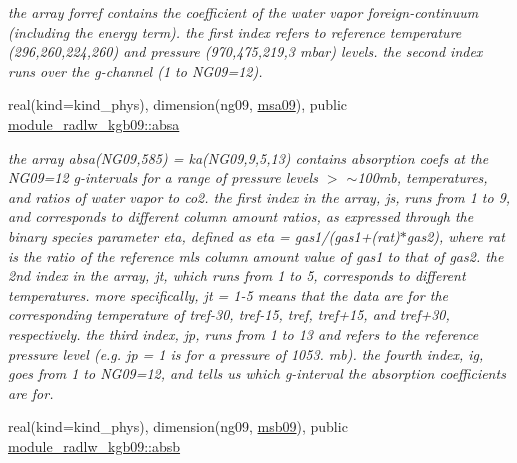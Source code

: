\begin{DoxyCompactItemize}
\begin{DoxyCompactList}\small\item\em the array forref contains the coefficient of the water vapor foreign-\/continuum (including the energy term). the first index refers to reference temperature (296,260,224,260) and pressure (970,475,219,3 mbar) levels. the second index runs over the g-\/channel (1 to N\+G09=12). \end{DoxyCompactList}\item 
\mbox{\label{group__module__radlw__kgbnn_ga7a8726efe46fac4d6cce55ca357199ab}} 
real(kind=kind\+\_\+phys), dimension(ng09, \hyperlink{namespacemodule__radlw__kgb09_ab739f0acab23f3140067506b396b3717}{msa09}), public \hyperlink{group__module__radlw__kgbnn_ga7a8726efe46fac4d6cce55ca357199ab}{module\+\_\+radlw\+\_\+kgb09\+::absa}
\begin{DoxyCompactList}\small\item\em the array absa(\+N\+G09,585) = ka(\+N\+G09,9,5,13) contains absorption coefs at the N\+G09=12 g-\/intervals for a range of pressure levels $>$ $\sim$100mb, temperatures, and ratios of water vapor to co2. the first index in the array, js, runs from 1 to 9, and corresponds to different column amount ratios, as expressed through the binary species parameter eta, defined as eta = gas1/(gas1+(rat)$\ast$gas2), where rat is the ratio of the reference mls column amount value of gas1 to that of gas2. the 2nd index in the array, jt, which runs from 1 to 5, corresponds to different temperatures. more specifically, jt = 1-\/5 means that the data are for the corresponding temperature of tref-\/30, tref-\/15, tref, tref+15, and tref+30, respectively. the third index, jp, runs from 1 to 13 and refers to the reference pressure level (e.\+g. jp = 1 is for a pressure of 1053. mb). the fourth index, ig, goes from 1 to N\+G09=12, and tells us which g-\/interval the absorption coefficients are for. \end{DoxyCompactList}\item 
\mbox{\label{group__module__radlw__kgbnn_gadb2110a245d9f01b3fd1ab058c883003}} 
real(kind=kind\+\_\+phys), dimension(ng09, \hyperlink{group__module__radlw__kgbnn_ga7e6bb7acb0df29586d0bd52f3fc41d90}{msb09}), public \hyperlink{group__module__radlw__kgbnn_gadb2110a245d9f01b3fd1ab058c883003}{module\+\_\+radlw\+\_\+kgb09\+::absb}

\end{DoxyCompactItemize}
